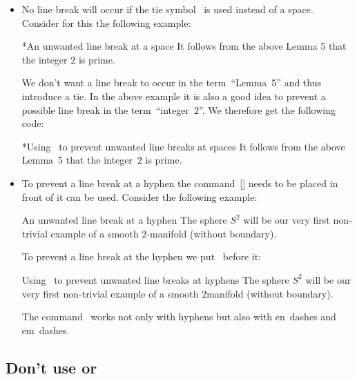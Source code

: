 \begin{itemize}
  \item
    No line break will occur if the tie\index{\customtexttilde} symbol~\inlinecode{\customtexttilde} is used instead of a space.
    Consider for this the following example:
    \begin{showlatex}*{An unwanted line break at a space}
It follows from the above Lemma 5 that the integer $2$ is prime.
    \end{showlatex}
    We don’t want a line break to occur in the term~\enquote{Lemma~5} and thus introduce a tie.
    In the above example it is also a good idea to prevent a possible line break in the term~\enquote{integer~$2$}.
    We therefore get the following code:
    \begin{showlatex}*{Using~\inlinecode{\customtexttilde} to prevent unwanted line breaks at spaces}
It follows from the above Lemma~5 that the integer~$2$ is prime.
    \end{showlatex}
  \item
    To prevent a line break at a hyphen the command~[\comname] needs to be placed in front of it can be used.
    Consider the following example:
    \begin{showlatex}{An unwanted line break at a hyphen}
The sphere $S^2$ will be our very first non-trivial example of a smooth $2$-manifold (without boundary).
    \end{showlatex}
    To prevent a line break at the hyphen we put~ before it:
    \begin{showlatex}{Using~ to prevent unwanted line breaks at hyphens}
The sphere $S^2$ will be our very first non-trivial example of a smooth $2${\nbd}manifold (without boundary).
    \end{showlatex}
    The command~ works not only with hyphens but also with en~dashes and em~dashes.
\end{itemize}



\subsection{Don’t use \comtitle{\tbs} or }


